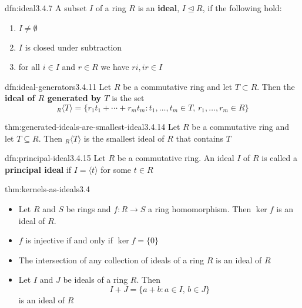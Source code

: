 \documentclass[landscape, 8pt]{extarticle}
\begin{document}
\begin{multicols}{3}
\begin{dfn}[Ideal]{dfn:ideal}{3.4.7}
    A subset $I$ of a ring $R$ is an \textbf{ideal}, $I \unlhd R$, if the following hold:
    \begin{enumerate}
        \setlength\itemsep{0em}
        \item $I \ne \emptyset$
        \item $I$ is closed under subtraction
        \item for all $i\in I$ and $r\in R$ we have $ri, ir\in I$
    \end{enumerate}
\end{dfn}

\begin{dfn}{dfn:ideal-generators}{3.4.11}
    Let $R$ be a commutative ring and let $T \subset R$. Then the \textbf{ideal of $R$ generated by $T$} is the set
    \[{}_{R}\langle T \rangle = \{r_{1}t_{1}+\cdots+r_{m}t_{m} : t_{1},\dots,t_{m}\in T,\,r_{1},\dots,r_{m}\in R\}\]
\end{dfn}

\begin{thm}[]{thm:generated-ideals-are-smallest-ideal}{3.4.14}
    Let $R$ be a commutative ring and let $T\subseteq R$. Then ${}_{R}\langle T \rangle$ is the smallest ideal of $R$ that contains $T$
\end{thm}

\begin{dfn}{dfn:principal-ideal}{3.4.15}
    Let $R$ be a commutative ring. An ideal $I$ of $R$ is called a \textbf{principal ideal} if $I = \langle t \rangle$ for some $t\in R$
\end{dfn}

\begin{thm}{thm:kernels-as-ideals}{3.4}

    \begin{itemize}
        \setlength\itemsep{0em}
        \item[\textbf{3.4.18}] Let $R$ and $S$ be rings and $f : R\to S$ a ring homomorphism. Then $\ker f$ is an ideal of $R$.
        \item[\textbf{3.4.20}] $f$ is injective if and only if $\ker f = \{0\}$
        \item[\textbf{3.4.21}] The intersection of any collection of ideals of a ring $R$ is an ideal of $R$
        \item[\textbf{3.4.22}] Let $I$ and $J$ be ideals of a ring $R$. Then
            \[I + J = \{a + b : a\in I,\, b\in J\}\]
            is an ideal of $R$
    \end{itemize}
\end{thm}


\end{multicols}
\end{document}

